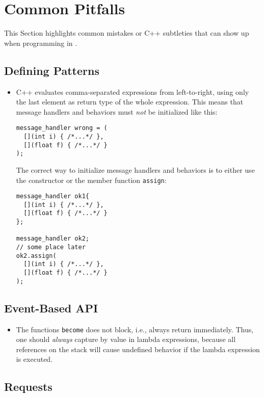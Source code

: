 \section{Common Pitfalls}
\label{pitfalls}

This Section highlights common mistakes or C++ subtleties that can show up when programming in \lib.

\subsection{Defining Patterns}

\begin{itemize}
\item C++ evaluates comma-separated expressions from left-to-right, using only the last element as return type of the whole expression. This means that message handlers and behaviors must \emph{not} be initialized like this:
\begin{lstlisting}
message_handler wrong = (
  [](int i) { /*...*/ },
  [](float f) { /*...*/ }
);
\end{lstlisting}
The correct way to initialize message handlers and behaviors is to either use the constructor or the member function \lstinline^assign^:
\begin{lstlisting}
message_handler ok1{
  [](int i) { /*...*/ },
  [](float f) { /*...*/ }
};

message_handler ok2;
// some place later
ok2.assign(
  [](int i) { /*...*/ },
  [](float f) { /*...*/ }
);
\end{lstlisting}
\end{itemize}

\subsection{Event-Based API}

\begin{itemize}
\item The functions \lstinline^become^ does not block, i.e., always return immediately.
Thus, one should \textit{always} capture by value in lambda expressions, because all references on the stack will cause undefined behavior if the lambda expression is executed.
\end{itemize}

\subsection{Requests}

